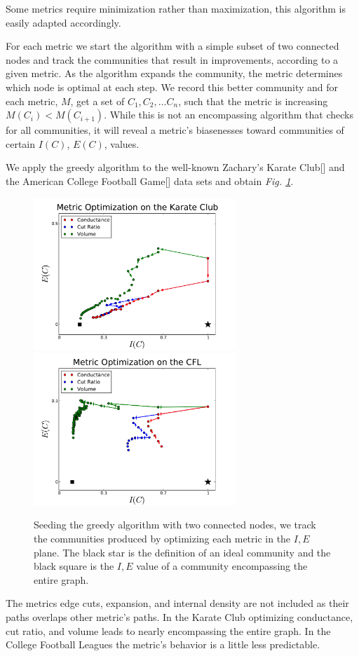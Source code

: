 \documentclass[conference]{IEEEtran}
\begin{document}
Some metrics require minimization rather than maximization, this algorithm is easily adapted accordingly.

For each metric we start the algorithm with a simple subset of two connected nodes and track the communities that result in improvements, according to a given metric.  As the algorithm expands the community, the metric determines which node is optimal at each step.  We record this better community and for each metric, $M$, get a set of $C_1, C_2, \dots C_n$, such that the metric is increasing $M(C_i) < M(C_{i+1})$.  While this is not an encompassing algorithm that checks for all communities, it will reveal a metric's biasenesses toward communities of certain $I(C)$, $E(C)$, values.

We apply the greedy algorithm to the well-known Zachary's Karate Club[] and the American College Football Game[] data sets and obtain {\it Fig.  \ref{fig_single_metrics}}.
\begin{figure}[!h]
\centering
\includegraphics[width=3in]{Figures/karate_metrics}
\includegraphics[width=3in]{Figures/football_metrics}
\caption{Seeding the greedy algorithm with two connected nodes, we track the communities produced by optimizing each metric in the $I, E$ plane.  The black star is the definition of an ideal community and the black square is the $I,E$ value of a community encompassing the entire graph.}
\label{fig_single_metrics}
\end{figure}
The metrics edge cuts, expansion, and internal density are not included as their paths overlaps other metric's paths.  In the Karate Club optimizing conductance, cut ratio, and volume leads to nearly encompassing the entire graph.  In the College Football Leagues the metric's behavior is a little less predictable.
\end{document}
